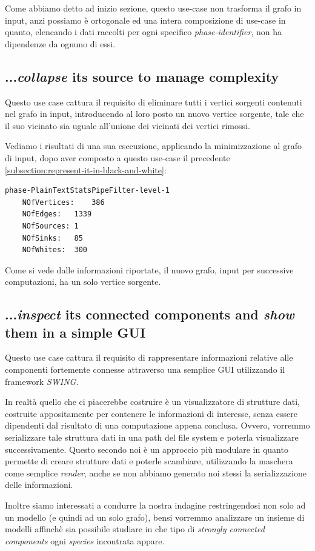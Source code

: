 Come abbiamo detto ad inizio sezione, questo use-case non trasforma il
grafo in input, anzi possiamo \`e ortogonale ed una intera
composizione di use-case in quanto, elencando i dati raccolti per ogni
specifico \emph{phase-identifier}, non ha dipendenze da ognuno di
essi.

\subsection{...\emph{collapse} its source to manage complexity}
Questo use case cattura il requisito di eliminare tutti i vertici
sorgenti contenuti nel grafo in input, introducendo al loro posto un
nuovo vertice sorgente, tale che il suo vicinato sia uguale all'unione
dei vicinati dei vertici rimossi.

Vediamo i risultati di una sua esecuzione, applicando la
minimizzazione al grafo di input, dopo aver composto a questo use-case
il precedente \ref{subsection:represent-it-in-black-and-white}:
\begin{lstlisting}
phase-PlainTextStatsPipeFilter-level-1
	NOfVertices:	386
	NOfEdges:	1339
	NOfSources:	1
	NOfSinks:	85
	NOfWhites:	300
\end{lstlisting}
Come si vede dalle informazioni riportate, il nuovo grafo, input per
successive computazioni, ha un solo vertice sorgente.

\subsection{...\emph{inspect} its connected components and \emph{show}
  them in a simple GUI}
\label{subsection:use-case-result-viewer}
Questo use case cattura il requisito di rappresentare informazioni
relative alle componenti fortemente connesse attraverso una semplice
GUI utilizzando il framework \emph{SWING}.

In realt\`a quello che ci piacerebbe costruire \`e un visualizzatore
di strutture dati, costruite appositamente per contenere le
informazioni di interesse, senza essere dipendenti dal risultato di
una computazione appena conclusa. Ovvero, vorremmo serializzare tale
struttura dati in una path del file system e poterla visualizzare
successivamente. Questo secondo noi \`e un approccio pi\`u modulare in
quanto permette di creare strutture dati e poterle scambiare,
utilizzando la maschera come semplice \emph{render}, anche se non
abbiamo generato noi stessi la serializzazione delle informazioni.

Inoltre siamo interessati a condurre la nostra indagine restringendosi
non solo ad un modello (e quindi ad un solo grafo), bensi vorremmo
analizzare un insieme di modelli affinch\`e sia possibile studiare in
che tipo di \emph{strongly connected components} ogni \emph{species}
incontrata appare.


